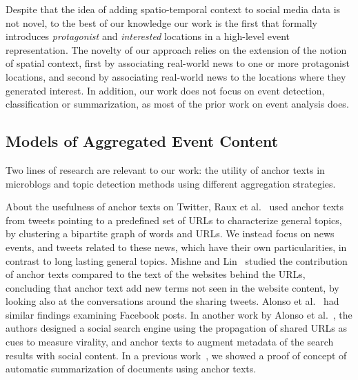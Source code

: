 
Despite that the idea of adding spatio-temporal context to social media data is
not novel, to the best of our knowledge our work is the first that formally
introduces {\em protagonist} and {\em interested} locations in a high-level
event representation.  
%
The novelty of our approach relies on the extension of the notion of spatial
context, first by associating real-world news to one or more protagonist
locations, and second by associating real-world news to the locations where they
generated interest.  
%
In addition, our work does not focus on event detection, classification or
summarization, as most of the prior work on event analysis does.




\subsection{Models of Aggregated Event Content}\label{sec:url-related}

Two lines of research are relevant to our work: the utility of anchor texts in
microblogs and topic detection methods using different aggregation strategies. 

%
About the usefulness of anchor texts on Twitter, Raux et
al.~\cite{raux2011describing} used anchor texts from tweets pointing to a
predefined set of URLs to characterize general topics, by clustering a bipartite
graph of words and URLs. 
%
We instead focus on news events, and tweets related to these news, which have
their own particularities, in contrast to long lasting general topics. 
%
Mishne and Lin~\cite{mishne2012twanchor} studied the contribution of anchor
texts compared to the text of the websites behind the URLs, concluding that
anchor text add new terms not seen in the website content, by looking also at
the conversations around the sharing tweets. 
%
Alonso et al.~\cite{Alonso:2015:WCW:2740908.2745397} had similar findings
examining Facebook posts. 
%
In another work by Alonso et al.~\cite{Alonso:2017:WHH:3091478.3091484}, the
authors designed a social search engine using the propagation of shared URLs as
cues to measure virality, and anchor texts to augment metadata of the search
results with social content. 
%
In a previous work~\cite{quezada2013understanding}, we showed a proof of concept
of automatic summarization of documents using anchor texts.
%


